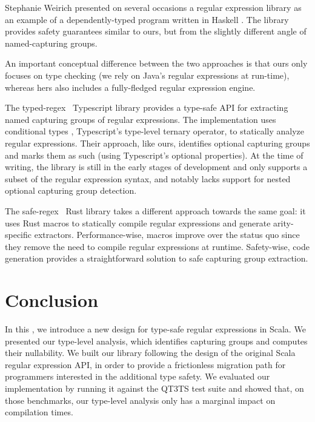 Stephanie Weirich presented on several occasions a regular expression library as an example of a dependently-typed program written in Haskell \citep{weirich2014examples}.
The library provides safety guarantees similar to ours, but from the slightly different angle of named-capturing groups.
\begin{diff}
An important conceptual difference between the two approaches is that ours only focuses on type checking (we rely on Java's regular expressions at run-time), whereas hers also includes a fully-fledged regular expression engine.

The typed-regex~\citep{akshay2021typed} Typescript library provides a type-safe API for extracting named capturing groups of regular expressions.
The implementation uses conditional types \citep{microsoft2020typescript}, Typescript's type-level ternary operator, to statically analyze regular expressions.
Their approach, like ours, identifies optional capturing groups and marks them as such (using Typescript's optional properties).
At the time of writing, the library is still in the early stages of development and only supports a subset of the regular expression syntax, and notably lacks support for nested optional capturing group detection.

The safe-regex~\citep{leonhard2021safe} Rust library takes a different approach towards the same goal: it uses Rust macros to statically compile regular expressions and generate arity-specific extractors.
Performance-wise, macros improve over the status quo since they remove the need to compile regular expressions at runtime.
Safety-wise, code generation provides a straightforward solution to safe capturing group extraction.
\end{diff}

\section{Conclusion}
\label{sec:conclusion}

In this \paper, we introduce a new design for type-safe regular expressions in Scala.
We presented our type-level analysis, which identifies capturing groups and computes their nullability.
We built our library following the design of the original Scala regular expression API, in order to provide a frictionless migration path for programmers interested in the additional type safety.
We evaluated our implementation by running it against the QT3TS test suite and showed that, on those benchmarks, our type-level analysis only has a marginal impact on compilation times.

